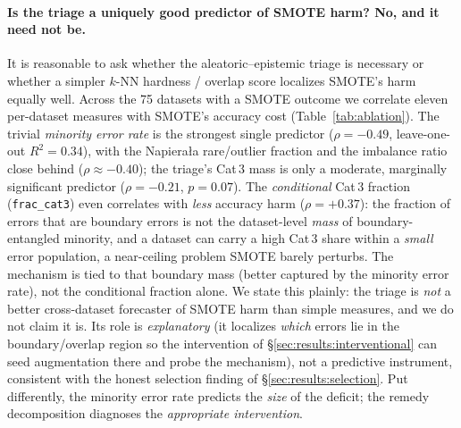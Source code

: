 \paragraph{Is the triage a uniquely good predictor of SMOTE harm? No, and it
need not be.} It is reasonable to ask whether the aleatoric--epistemic triage
is necessary or whether a simpler $k$-NN hardness / overlap score localizes
SMOTE's harm equally well. Across the 75 datasets with a SMOTE outcome we correlate
eleven per-dataset measures with SMOTE's accuracy cost (Table~\ref{tab:ablation}).
The trivial \emph{minority error rate} is the strongest single predictor
($\rho=-0.49$, leave-one-out $R^2=0.34$), with the Napiera{\l}a rare/outlier
fraction and the imbalance ratio close behind ($\rho\approx-0.40$); the triage's
Cat\,3 mass is only a moderate, marginally significant predictor ($\rho=-0.21$,
$p=0.07$). The \emph{conditional} Cat\,3 fraction (\texttt{frac\_cat3}) even
correlates with \emph{less} accuracy harm ($\rho=+0.37$): the fraction of errors
that are boundary errors is not the dataset-level \emph{mass} of boundary-entangled
minority, and a dataset can carry a high Cat\,3 share within a \emph{small} error
population, a near-ceiling problem SMOTE barely perturbs. The mechanism is tied
to that boundary mass (better captured by the minority error rate), not the
conditional fraction alone. We state this plainly: the triage is \emph{not} a better
cross-dataset forecaster of SMOTE harm than simple measures, and we do not claim it
is. Its role
is \emph{explanatory} (it localizes \emph{which} errors lie in the
boundary/overlap region so the intervention of
\S\ref{sec:results:interventional} can seed augmentation there and probe the
mechanism), not a predictive instrument, consistent with the honest selection
finding of \S\ref{sec:results:selection}. Put differently, the minority error rate
predicts the \emph{size} of the deficit; the remedy decomposition diagnoses the
\emph{appropriate intervention}.

\begin{table}[t]
\centering
\caption{Triage-design ablation: Spearman correlation of each per-dataset measure
with SMOTE's accuracy change ($\Delta$acc) and balanced-accuracy change
($\Delta$bacc), and a single-feature leave-one-out $R^2$ for $\Delta$acc, over 75
datasets. The triage's Cat\,3 mass is not a stronger predictor of SMOTE harm than
simple hardness/imbalance measures; the triage's value is explanatory, not
predictive. $^{*}$: $p<0.05$.}
\label{tab:ablation}
\footnotesize

\end{table}

